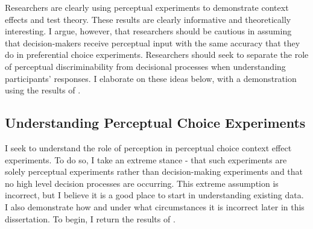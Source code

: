 \documentclass{umassthesis}          %
\begin{document}
Researchers are clearly using perceptual experiments to demonstrate context effects and test theory. These results are clearly informative and theoretically interesting. I argue, however, that researchers should be cautious in assuming that decision-makers receive perceptual input with the same accuracy that they do in preferential choice experiments. Researchers should seek to separate the role of perceptual discriminability from decisional processes when understanding participants' responses. I elaborate on these ideas below, with a demonstration using the results of \textcite{spektorWhenGoodLooks2018b}.

\subsection{Understanding Perceptual Choice Experiments}

I seek to understand the role of perception in perceptual choice context effect experiments. To do so, I take an extreme stance - that such experiments are solely perceptual experiments rather than decision-making experiments and that no high level decision processes are occurring. This extreme assumption is incorrect, but I believe it is a good place to start in understanding existing data. I also demonstrate how and under what circumstances it is incorrect later in this dissertation. To begin, I return the results of \textcite{spektorWhenGoodLooks2018b}. 
\end{document}
